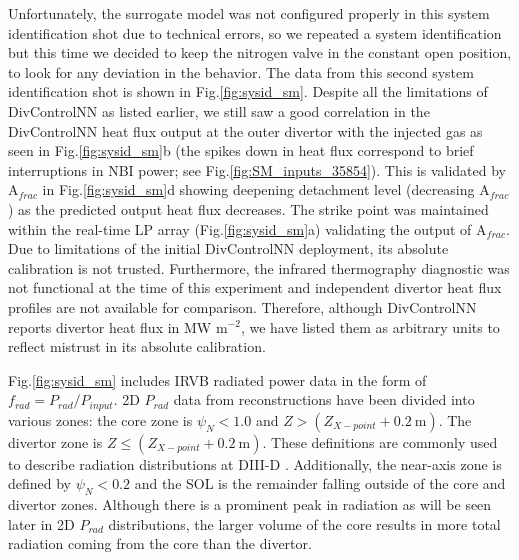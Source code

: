 \documentclass[10pt]{iopart}
\newcommand{\Afrac}{A$_{frac}$}
\begin{document}
Unfortunately, the surrogate model was not configured properly in this system identification shot due to technical errors, so we repeated a system identification but this time we decided to keep the nitrogen valve in the constant open position, to look for any deviation in the behavior.
The data from this second system identification shot is shown in Fig.\ref{fig:sysid_sm}.
Despite all the limitations of DivControlNN as listed earlier, we still saw a good correlation in the DivControlNN heat flux output at the outer divertor with the injected gas as seen in Fig.\ref{fig:sysid_sm}b (the spikes down in heat flux correspond to brief interruptions in NBI power; see Fig.\ref{fig:SM_inputs_35854}).
This is validated by \Afrac{} in Fig.\ref{fig:sysid_sm}d showing deepening detachment level (decreasing \Afrac{}) as the predicted output heat flux decreases.
The strike point was maintained within the real-time \ac{LP}  array (Fig.\ref{fig:sysid_sm}a) validating the output of \Afrac{}.
Due to limitations of the initial DivControlNN deployment, its absolute calibration is not trusted.
Furthermore, the infrared thermography diagnostic was not functional at the time of this experiment and independent divertor heat flux profiles are not available for comparison.
Therefore, although DivControlNN reports divertor heat flux in MW m$^{-2}$, we have listed them as arbitrary units to reflect mistrust in its absolute calibration.

Fig.\ref{fig:sysid_sm} includes IRVB radiated power data in the form of $f_{rad} = P_{rad} / P_{input}$.
2D $P_{rad}$ data from reconstructions have been divided into various zones: the core zone is $\psi_N < 1.0$ and $Z > (Z_{X-point} + 0.2~\mathrm{m})$.
The divertor zone is $Z \leq (Z_{X-point} + 0.2~\mathrm{m})$.
These definitions are commonly used to describe radiation distributions at \mbox{DIII-D} \cite{leonard_1995_rsi, eldon_2025_ppcf}.
Additionally, the near-axis zone is defined by $\psi_N < 0.2$ and the SOL is the remainder falling outside of the core and divertor zones.
Although there is a prominent peak in radiation as will be seen later in 2D $P_{rad}$ distributions, the larger volume of the core results in more total radiation coming from the core than the divertor.
\end{document}
